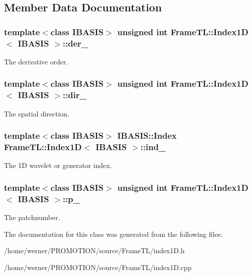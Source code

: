 \subsection{Member Data Documentation}
\hypertarget{classFrameTL_1_1Index1D_edcb84781a4ebd4dde1a85197fd270f6}{
\subsubsection[{der\_\-}]{\setlength{\rightskip}{0pt plus 5cm}template$<$class IBASIS$>$ unsigned int {\bf FrameTL::Index1D}$<$ IBASIS $>$::{\bf der\_\-}}}
\label{classFrameTL_1_1Index1D_edcb84781a4ebd4dde1a85197fd270f6}


The derivative order. \hypertarget{classFrameTL_1_1Index1D_6415d2263117ba0f0b88acfb6b25558b}{
\subsubsection[{dir\_\-}]{\setlength{\rightskip}{0pt plus 5cm}template$<$class IBASIS$>$ unsigned int {\bf FrameTL::Index1D}$<$ IBASIS $>$::{\bf dir\_\-}}}
\label{classFrameTL_1_1Index1D_6415d2263117ba0f0b88acfb6b25558b}


The spatial direction. \hypertarget{classFrameTL_1_1Index1D_b6de25bfbba40ba29cb649ee96c8e3dd}{
\subsubsection[{ind\_\-}]{\setlength{\rightskip}{0pt plus 5cm}template$<$class IBASIS$>$ IBASIS::Index {\bf FrameTL::Index1D}$<$ IBASIS $>$::{\bf ind\_\-}}}
\label{classFrameTL_1_1Index1D_b6de25bfbba40ba29cb649ee96c8e3dd}


The 1D wavelet or generator index. \hypertarget{classFrameTL_1_1Index1D_76b815344076e70d88f55782813d380e}{
\subsubsection[{p\_\-}]{\setlength{\rightskip}{0pt plus 5cm}template$<$class IBASIS$>$ unsigned int {\bf FrameTL::Index1D}$<$ IBASIS $>$::{\bf p\_\-}}}
\label{classFrameTL_1_1Index1D_76b815344076e70d88f55782813d380e}


The patchnumber. 

The documentation for this class was generated from the following files:\begin{CompactItemize}
\item 
/home/werner/PROMOTION/source/FrameTL/index1D.h\item 
/home/werner/PROMOTION/source/FrameTL/index1D.cpp\end{CompactItemize}
